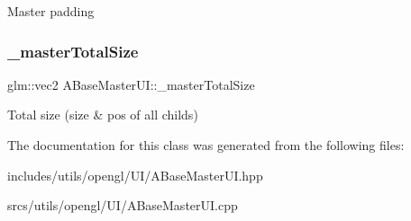 Master padding \mbox{\label{class_a_base_master_u_i_a1f2c4794773a4a3dcc00bd2871756898}} 
\subsubsection{\texorpdfstring{\+\_\+master\+Total\+Size}{\_masterTotalSize}}
{\footnotesize\ttfamily glm\+::vec2 A\+Base\+Master\+U\+I\+::\+\_\+master\+Total\+Size\hspace{0.3cm}{\ttfamily [protected]}}

Total size (size \& pos of all childs) 

The documentation for this class was generated from the following files\+:\begin{DoxyCompactItemize}
\item 
includes/utils/opengl/\+U\+I/A\+Base\+Master\+U\+I.\+hpp\item 
srcs/utils/opengl/\+U\+I/A\+Base\+Master\+U\+I.\+cpp\end{DoxyCompactItemize}

